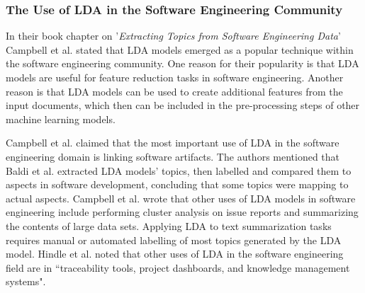         
        \subsubsection{The Use of LDA in the Software Engineering Community}
            In their book chapter on '\emph{Extracting Topics from Software Engineering Data}' Campbell et al. \cite{campbell2015latent} stated that LDA models emerged as a popular technique within the software engineering community. One reason for their popularity is that LDA models are useful for feature reduction tasks in software engineering. Another reason is that LDA models can be used to create additional features from the input documents, which then can be included in the pre-processing steps of other machine learning models. 
            
            Campbell et al. \cite{campbell2015latent} claimed that the most important use of LDA in the software engineering domain is linking software artifacts. The authors mentioned that Baldi et al. \cite{baldi2008theory} extracted LDA models' topics, then labelled and compared them to aspects in software development, concluding that some topics were mapping to actual aspects. Campbell et al. \cite{campbell2015latent} wrote that other uses of LDA models in software engineering include performing cluster analysis on issue reports and summarizing the contents of large data sets. Applying LDA to text summarization tasks requires manual or automated labelling of most topics generated by the LDA model. Hindle et al. \cite{hindle2012relating} noted that other uses of LDA in the software engineering field are in ``traceability tools, project dashboards, and knowledge management systems".
            
            
            
                
                
                
                
        
